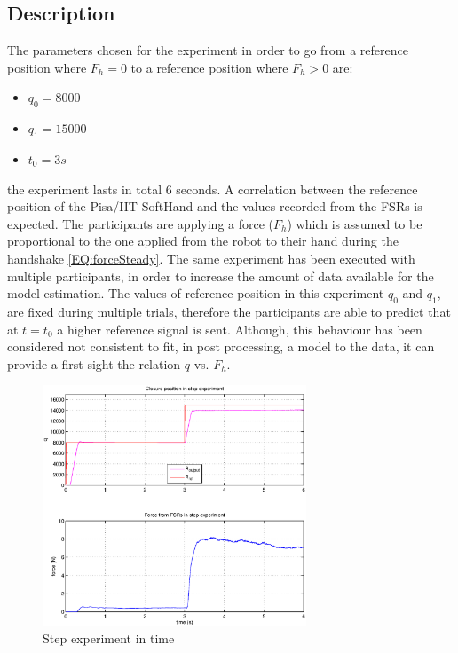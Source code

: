 \subsection{Description}
The parameters chosen for the experiment in order to go from a reference position where $F_h=0$ to a reference position where $F_h > 0$ are:
\begin{itemize}
\item $q_0 = 8000 $
\item $q_1 = 15000$
\item $t_0 = 3s$
\end{itemize}
the experiment lasts in total 6 seconds. A correlation between the reference position of the Pisa/IIT SoftHand and the values recorded from the FSRs is expected. The participants are applying a force ($F_{h}$) which is assumed to be proportional to the one applied from the robot to their hand during the handshake \ref{EQ:forceSteady}.
The same experiment has been executed with multiple participants, in order to increase the amount of data available for the model estimation. The values of reference position in this experiment $q_{0}$ and $q_{1}$, are fixed during multiple trials, therefore the participants are able to predict that at $t=t_0$ a higher reference signal is sent. Although, this behaviour has been considered not consistent to fit, in post processing, a model to the data, it can provide a first sight the relation $q$ vs. $F_h$.
%
%
\begin{figure}[h]
\centering
\includegraphics[width=0.7\textwidth]{Figure/step.eps}
  \caption{Step experiment in time}
  \label{Fig:step}
\end{figure}

